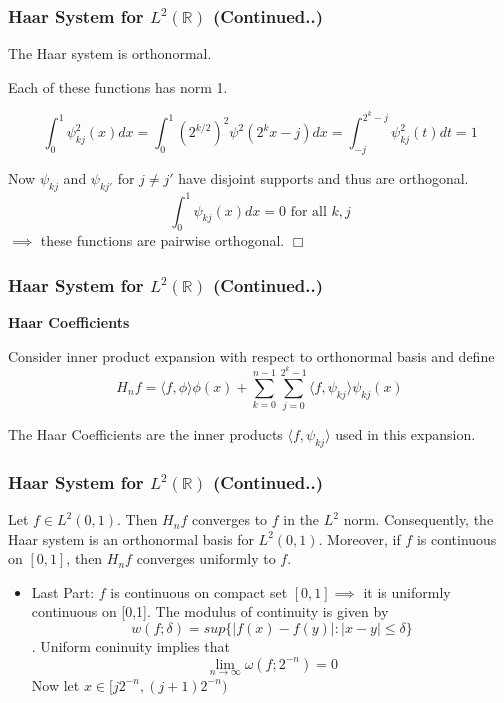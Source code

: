 \documentclass{beamer}
\newcommand{\qedwhite}{\hfill \ensuremath{\Box}}
\begin{document}
\begin{frame}
\frametitle{Haar System for  $L^2\left({\mathbb{R}}\right)$ (Continued..)}

\begin{lemma}[15.2.1]
    The Haar system is orthonormal.
\end{lemma}


Each of these functions has norm 1. 

$$\int_0^1\psi_{kj}^2(x)dx = \int_0^1 (2^{k/2})^2\psi^2(2^kx-j)dx = \int_{-j}^{2^k-j} \psi_{kj}^2(t)dt = 1$$


Now $\psi_{kj}$ and $\psi_{kj'}$ for $j \ne j'$ have disjoint supports and thus are orthogonal. 
$$\int_0^1\psi_{kj}(x)dx = 0 \text{ for all } k, j$$
$\implies$ these functions are pairwise orthogonal.
\qedwhite
\end{frame}

\begin{frame}
\frametitle{Haar System for  $L^2\left({\mathbb{R}}\right)$ (Continued..)}
\textbf{Haar Coefficients}
\linebreak

Consider inner product expansion with respect to orthonormal basis and define
    $$H_nf = \langle f, \phi\rangle \phi(x) + \sum_{k=0}^{n-1}  \sum_{j=0}^{2^k-1} \langle f, \psi_{kj}\rangle \psi_{kj}(x)$$

The Haar Coefficients are the inner products $\langle f, \psi_{kj}\rangle$ used in this expansion.
\end{frame}

\begin{frame}
    \frametitle{Haar System for  $L^2\left({\mathbb{R}}\right)$ (Continued..)}

\begin{theorem}[15.2.3]
    Let $f \in L^2(0,1)$. Then $H_nf$ converges to $f$ in the $L^2$ norm.
    Consequently, the Haar system is an orthonormal basis for $L^2(0,1)$. 
    Moreover, if $f$ is continuous on $[0, 1]$, then $H_nf$ converges uniformly to $f$.
\end{theorem}


\begin{itemize}
    \item Last Part: $f$ is continuous on compact set $[0,1] \implies$ it is uniformly continuous on [0,1].
    The modulus of continuity is  given  by $$w(f;\delta)  = sup\{|f(x)-f(y)| : |x - y| \le \delta\}$$. 
    Uniform coninuity implies that $$\lim_{n \to \infty} \omega(f;2^{-n})=0$$
    Now let $x \in [j2^{-n}, (j+1)2^{-n})$
\end{itemize}

\end{frame}
\end{document}
